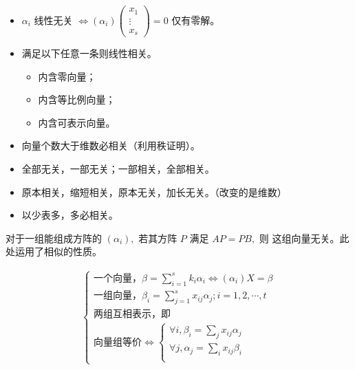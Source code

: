 
\begin{itemize}
    \item $ \alpha_i $ 线性无关 $ \Leftrightarrow (\alpha_i)\begin{pmatrix}
        x_1\\ \vdots \\ x_s
    \end{pmatrix} = 0 $ 仅有零解。
    \item 满足以下任意一条则线性相关。
    \begin{itemize}
        \item 内含零向量；
        \item 内含等比例向量；
        \item 内含可表示向量。
    \end{itemize}
    \item 向量个数大于维数必相关（利用秩证明）。
    \item 全部无关，一部无关；一部相关，全部相关。
    \item 原本相关，缩短相关，原本无关，加长无关。（改变的是维数）
    \item 以少表多，多必相关。
\end{itemize}

对于一组能组成方阵的 $ (\alpha_i), $ 若其方阵 $ P $ 满足 $ AP = PB, $ 则
这组向量无关。此处运用了相似的性质。


\begin{equation*}
    \begin{aligned}
        \begin{cases}
            \textrm{一个向量，} \beta = \sum_{i = 1}^s k_i\alpha_i \Leftrightarrow (\alpha_i)X = \beta\\ 
            \textrm{一组向量，} \beta_i = \sum_{j = 1}^s x_{ij}\alpha_j; i = 1,2,\cdots, t\\ 
            \textrm{两组互相表示，即}\\ \textrm{向量组等价}\Leftrightarrow
            \begin{cases}
                \forall i, \beta_i = \sum_j x_{ij}\alpha_j \\ 
                \forall j, \alpha_j = \sum_i x_{ij}\beta_i \\ 
            \end{cases}
        \end{cases}
    \end{aligned}
\end{equation*}

